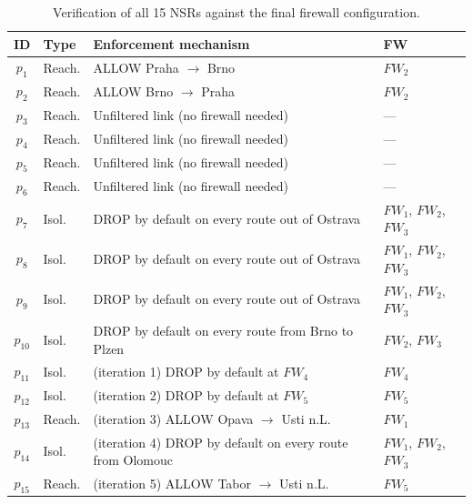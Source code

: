 \begin{table}[H]
\centering
\caption{Verification of all 15 NSRs against the final firewall configuration.}
\label{tab:cesnet-verify}
\begin{tabularx}{\textwidth}{@{}cl X >{\raggedright\arraybackslash}p{2.4cm}@{}}
\hline
\textbf{ID} & \textbf{Type} & \textbf{Enforcement mechanism} & \textbf{FW} \\
\hline
$p_1$    & Reach. & ALLOW Praha $\to$ Brno                                     & $\mathit{FW}_2$ \\
$p_2$    & Reach. & ALLOW Brno $\to$ Praha                                     & $\mathit{FW}_2$ \\
$p_3$    & Reach. & Unfiltered link (no firewall needed)                       & — \\
$p_4$    & Reach. & Unfiltered link (no firewall needed)                       & — \\
$p_5$    & Reach. & Unfiltered link (no firewall needed)                       & — \\
$p_6$    & Reach. & Unfiltered link (no firewall needed)                       & — \\
$p_7$    & Isol.  & DROP by default on every route out of Ostrava              & $\mathit{FW}_1$, $\mathit{FW}_2$, $\mathit{FW}_3$ \\
$p_8$    & Isol.  & DROP by default on every route out of Ostrava              & $\mathit{FW}_1$, $\mathit{FW}_2$, $\mathit{FW}_3$ \\
$p_9$    & Isol.  & DROP by default on every route out of Ostrava              & $\mathit{FW}_1$, $\mathit{FW}_2$, $\mathit{FW}_3$ \\
$p_{10}$ & Isol.  & DROP by default on every route from Brno to Plzen          & $\mathit{FW}_2$, $\mathit{FW}_3$ \\
$p_{11}$ & Isol.  & (iteration 1) DROP by default at $\mathit{FW}_4$           & $\mathit{FW}_4$ \\
$p_{12}$ & Isol.  & (iteration 2) DROP by default at $\mathit{FW}_5$           & $\mathit{FW}_5$ \\
$p_{13}$ & Reach. & (iteration 3) ALLOW Opava $\to$ Usti n.L.                  & $\mathit{FW}_1$ \\
$p_{14}$ & Isol.  & (iteration 4) DROP by default on every route from Olomouc  & $\mathit{FW}_1$, $\mathit{FW}_2$, $\mathit{FW}_3$ \\
$p_{15}$ & Reach. & (iteration 5) ALLOW Tabor $\to$ Usti n.L.                  & $\mathit{FW}_5$ \\
\hline
\end{tabularx}
\end{table}

